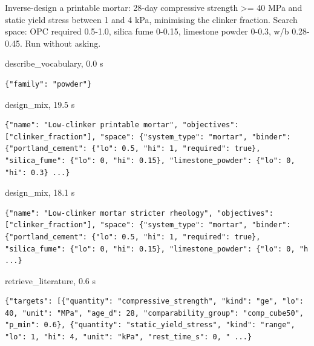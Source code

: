 \begin{userbox}
Inverse-design a printable mortar: 28-day compressive strength >= 40 MPa and static yield stress between 1 and 4 kPa, minimising the clinker fraction. Search space: OPC required 0.5-1.0, silica fume 0-0.15, limestone powder 0-0.3, w/b 0.28-0.45. Run without asking.
\end{userbox}
\begin{toolbox}{describe\_vocabulary, 0.0 s}
\begin{lstlisting}[style=argstyle]
{"family": "powder"}
\end{lstlisting}
\end{toolbox}
\begin{toolbox}{design\_mix, 19.5 s}
\begin{lstlisting}[style=argstyle]
{"name": "Low-clinker printable mortar", "objectives": ["clinker_fraction"], "space": {"system_type": "mortar", "binder": {"portland_cement": {"lo": 0.5, "hi": 1, "required": true}, "silica_fume": {"lo": 0, "hi": 0.15}, "limestone_powder": {"lo": 0, "hi": 0.3} ...}
\end{lstlisting}
\end{toolbox}
\begin{toolbox}{design\_mix, 18.1 s}
\begin{lstlisting}[style=argstyle]
{"name": "Low-clinker mortar stricter rheology", "objectives": ["clinker_fraction"], "space": {"system_type": "mortar", "binder": {"portland_cement": {"lo": 0.5, "hi": 1, "required": true}, "silica_fume": {"lo": 0, "hi": 0.15}, "limestone_powder": {"lo": 0, "h ...}
\end{lstlisting}
\end{toolbox}
\begin{toolbox}{retrieve\_literature, 0.6 s}
\begin{lstlisting}[style=argstyle]
{"targets": [{"quantity": "compressive_strength", "kind": "ge", "lo": 40, "unit": "MPa", "age_d": 28, "comparability_group": "comp_cube50", "p_min": 0.6}, {"quantity": "static_yield_stress", "kind": "range", "lo": 1, "hi": 4, "unit": "kPa", "rest_time_s": 0, " ...}
\end{lstlisting}
\end{toolbox}
